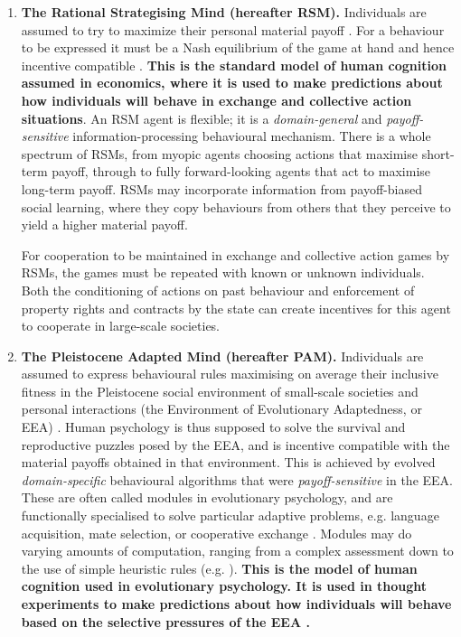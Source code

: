 \documentclass[10pt, a4paper, fleqn]{article}
\begin{document}
 
 \renewcommand{\labelenumi}{(\arabic{enumi})}
 \begin{enumerate}
 
 \item \textbf{The Rational Strategising Mind (hereafter RSM).} Individuals are assumed to try to maximize their personal material payoff \citep{MasCollelWG95,Ober:2008:a,Fukuyama:2011:a}. For a behaviour to be expressed it must be a Nash equilibrium of the game at hand and hence incentive compatible \citep{Kreps:1988:a,Hurwicz:1996:a,Fudenberg:1991:a}. \textbf{This is the standard model of human cognition assumed in economics, where it is used to make predictions about how individuals will behave in exchange and collective action situations}. An RSM agent is flexible; it is a \textit{domain-general} and \textit{payoff-sensitive} information-processing behavioural mechanism. There is a whole spectrum of RSMs, from myopic agents choosing actions that maximise short-term payoff, through to fully forward-looking agents that act to maximise long-term payoff. RSMs may incorporate information from payoff-biased social learning, where they copy behaviours from others that they perceive to yield a higher material payoff. 
 
For cooperation to be maintained in exchange and collective action games by RSMs, the games must be repeated with known or unknown individuals. Both the conditioning of actions on past behaviour and enforcement of property rights and contracts by the state can create incentives for this agent to cooperate in large-scale societies.  

 
\item \textbf{The Pleistocene Adapted Mind (hereafter PAM).} Individuals are assumed to express behavioural rules maximising on average their inclusive fitness in the Pleistocene social environment of small-scale societies and personal interactions (the Environment of Evolutionary Adaptedness, or EEA) \citep{Alexander:1990:a,Barkow:1992:a,Cosmides:2013:a}. Human psychology is thus supposed to solve the survival and reproductive puzzles posed by the EEA, and is incentive compatible with the material payoffs obtained in that environment. This is achieved by evolved \textit{domain-specific} behavioural algorithms that were \textit{payoff-sensitive} in the EEA. These are often called modules in evolutionary psychology, and are functionally specialised to solve particular adaptive problems, e.g. language acquisition, mate selection, or cooperative exchange \citep{Lumsden:1981:a,Alexander:1990:a} \citep[p.~24]{Barkow:1992:a}. Modules may do varying amounts of computation, ranging from a complex assessment down to the use of simple heuristic rules (e.g. \citealt{Gigerenzer:2009:a}). \textbf{This is the model of human cognition used in evolutionary psychology. It is used in thought experiments to make predictions about how individuals will behave based on the selective pressures of the EEA \citep{Cosmides:1994:a}.} 


\end{enumerate}
\end{document}
